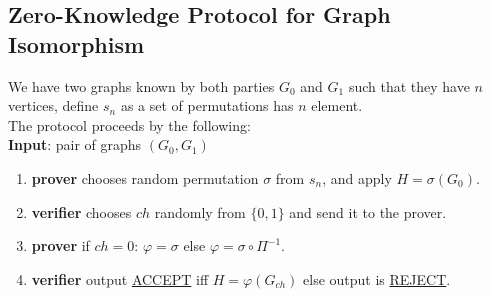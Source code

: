 \documentclass[12pt,a4paper]{article}
\begin{document}
\subsection{ Zero-Knowledge Protocol for Graph Isomorphism}
We have two graphs known by both parties $G_0$ and $G_1$ such that they have $n$ vertices, define $s_n$ as a set of permutations has $n$ element.\\   
The protocol proceeds by the following:\cite{lec-notes1:3}\\
\textbf{Input}: pair of graphs $(G_0,G_1)$
\begin{enumerate}	
	\item
	\begin{enumerate}
\textbf{prover} chooses random permutation $\sigma$ from $s_n$, and apply $H=\sigma(G_0)$.
\end{enumerate}
	\item
\begin{enumerate}
\textbf{verifier}  chooses $ch$ randomly from $\{0,1\}$ and send it to the prover.
\end{enumerate}
	\item
\begin{enumerate}
\textbf{prover} if $ch=0$: $\varphi=\sigma$ else $\varphi=\sigma \circ \Pi^{-1}$.
\end{enumerate}
	\item
\begin{enumerate}
\textbf{verifier} output \underline{ACCEPT} iff $H=\varphi(G_{ch})$ else output is \underline{REJECT}.\\

\end{enumerate}
\end{enumerate}
\end{document}
